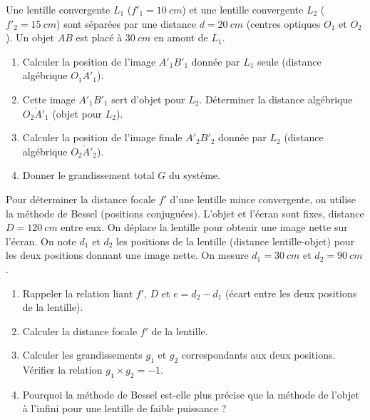 \documentclass[11pt]{article}
\begin{document}
\begin{exercice}
Une lentille convergente $L_1$ ($f'_1 = \SI{10}{cm}$) et une lentille convergente $L_2$ ($f'_2 = \SI{15}{cm}$) sont séparées par une distance $d = \SI{20}{cm}$ (centres optiques $O_1$ et $O_2$). Un objet $AB$ est placé à $\SI{30}{cm}$ en amont de $L_1$.
\begin{enumerate}
    \item Calculer la position de l'image $A'_1B'_1$ donnée par $L_1$ seule (distance algébrique $\overline{O_1A'_1}$).
    \item Cette image $A'_1B'_1$ sert d'objet pour $L_2$. Déterminer la distance algébrique $\overline{O_2A'_1}$ (objet pour $L_2$).
    \item Calculer la position de l'image finale $A'_2B'_2$ donnée par $L_2$ (distance algébrique $\overline{O_2A'_2}$).
    \item Donner le grandissement total $G$ du système.
\end{enumerate}
\end{exercice}

\begin{exercice}
Pour déterminer la distance focale $f'$ d'une lentille mince convergente, on utilise la méthode de Bessel (positions conjuguées). L'objet et l'écran sont fixes, distance $D = \SI{120}{cm}$ entre eux. On déplace la lentille pour obtenir une image nette sur l'écran. On note $d_1$ et $d_2$ les positions de la lentille (distance lentille-objet) pour les deux positions donnant une image nette. On mesure $d_1 = \SI{30}{cm}$ et $d_2 = \SI{90}{cm}$.
\begin{enumerate}
    \item Rappeler la relation liant $f'$, $D$ et $e = d_2 - d_1$ (écart entre les deux positions de la lentille).
    \item Calculer la distance focale $f'$ de la lentille.
    \item Calculer les grandissements $g_1$ et $g_2$ correspondants aux deux positions. Vérifier la relation $g_1 \times g_2 = -1$.
    \item Pourquoi la méthode de Bessel est-elle plus précise que la méthode de l'objet à l'infini pour une lentille de faible puissance ?
\end{enumerate}
\end{exercice}
\end{document}
